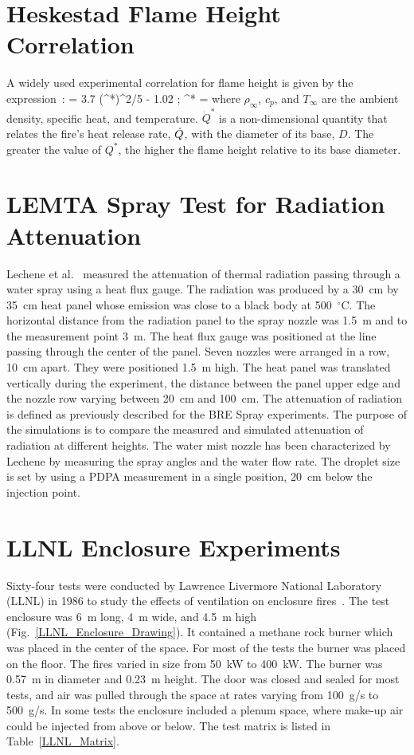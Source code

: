 \section{Heskestad Flame Height Correlation}

A widely used experimental correlation for flame height is given by the expression~\cite{Heskestad:FSJ1983,SFPE:Heskestad}:
\be
    = 3.7 \; (^*)^{2/5} - 1.02  \quad ; \quad {}^* = 
\ee
where $\rho_\infty$, $c_p$, and $T_\infty$ are the ambient density, specific heat, and temperature. $\dot{Q}^*$ is a non-dimensional quantity that relates the fire's heat release rate, $\dot{Q}$, with the diameter of its base, $D$. The greater the value of $Q^*$, the higher the flame height relative to its base diameter.


\section{LEMTA Spray Test for Radiation Attenuation}

Lechene et al.~\cite{Lechene} measured the attenuation of thermal radiation passing through a water spray using a heat flux gauge. The radiation was produced by a 30~cm by 35~cm heat panel whose emission was close to a black body at 500~$^\circ$C. The horizontal distance from the radiation panel to the spray nozzle was 1.5~m and to the measurement point 3~m. The heat flux gauge was positioned at the line passing through the center of the panel. Seven nozzles were arranged in a row, 10~cm apart. They were positioned 1.5~m high. The heat panel was translated vertically during the experiment, the distance between the panel upper edge and the nozzle row varying between 20~cm and 100~cm. The attenuation of radiation is defined as previously described for the BRE Spray experiments. The purpose of the simulations is to compare the measured and simulated attenuation of radiation at different heights. The water mist nozzle has been characterized by Lechene by measuring the spray angles and the water flow rate. The droplet size is set by using a PDPA measurement in a single position, 20~cm below the injection point.


\section{LLNL Enclosure Experiments}

Sixty-four tests were conducted by Lawrence Livermore National Laboratory (LLNL) in 1986 to study the effects of ventilation on enclosure fires~\cite{Foote:LLNL1986}. The test enclosure was 6~m long, 4~m wide, and 4.5~m high (Fig.~\ref{LLNL_Enclosure_Drawing}). It contained a methane rock burner which was placed in the center of the space. For most of the tests the burner was placed on the floor. The fires varied in size from 50~kW to 400~kW. The burner was 0.57~m in diameter and 0.23~m height. The door was closed and sealed for most tests, and air was pulled through the space at rates varying from 100~g/s to 500~g/s. In some tests the enclosure included a plenum space, where make-up air could be injected from above or below. The test matrix is listed in Table~\ref{LLNL_Matrix}.

